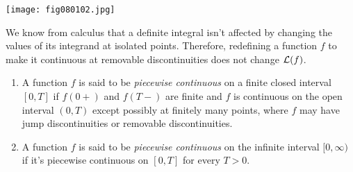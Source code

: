 \documentclass{ximera}
\begin{document}
\begin{image}
 \texttt{[image: fig080102.jpg]}
 \end{image}


\begin{remark}
We know from calculus that a definite integral isn't
affected by changing the values of its integrand at isolated points.
Therefore, redefining a function $f$ to make it continuous at
removable discontinuities does not change ${\cal L}(f)$.
\end{remark}

\begin{definition}\label{thmtype:8.1.4}

\begin{enumerate}
    \item\label{item:8.1.4a} %
A function $f$ is said to be \textit{piecewise continuous} on a finite
closed interval $[0,T]$ if $f(0+)$ and $f(T-)$ are finite and $f$ is
continuous on the open interval $(0,T)$ except possibly at finitely
many points, where $f$ may have jump discontinuities or removable
discontinuities.
\item\label{item:8.1.4b} %
A function $f$ is said to be \textit{piecewise continuous} on the
infinite interval $[0,\infty)$ if it's piecewise continuous on
$[0,T]$ for every $T>0$.
\end{enumerate}
\end{definition}
\end{document}

